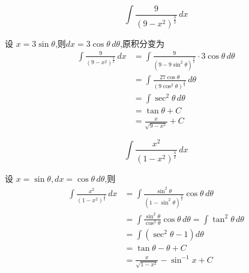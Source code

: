 \begin{questions}
    \question 
    \[
    \int \frac{9}{(9 - x^2)^{\frac{3}{2}}} \, dx
    \]
    \begin{solution}
        设 $x = 3\sin\theta$,则$dx = 3\cos\theta \, d\theta$,原积分变为
        \begin{align*}
        \int \frac{9}{(9 - x^2)^{\frac{3}{2}}} \, dx
        &= \int \frac{9}{(9 - 9\sin^2\theta)^{\frac{3}{2}}} \cdot 3\cos\theta \, d\theta\\
        &= \int \frac{27\cos\theta}{(9\cos^2\theta)^{\frac{3}{2}}} \, d\theta\\
        &= \int \sec^2\theta \, d\theta\\
        &= \tan\theta + C \\
        &= \frac{x}{\sqrt{9-x^2}} + C
        \end{align*}
    \end{solution}

    \question 
    \[
    \int \frac{x^2}{(1-x^2)^{\frac{3}{2}}} \,dx
    \]
    \begin{solution}
        设 $x = \sin \theta, dx = \cos \theta \, d\theta$,则
        \begin{align*}
        \int \frac{x^2}{(1-x^2)^{\frac{3}{2}}} \,dx
        &=\int \frac{\sin^2 \theta}{(1 - \sin^2 \theta)^{\frac{3}{2}}} \cos \theta \, d\theta \\
        &= \int \frac{\sin^2 \theta}{\cos^3 \theta} \cos \theta \, d\theta = \int \tan^2 \theta \, d\theta \\
        &= \int (\sec^2 \theta - 1) d\theta \\
        &= \tan \theta - \theta + C \\
        &= \frac{x}{\sqrt{1-x^2}} - \sin^{-1} x + C
        \end{align*}
    \end{solution}


\end{questions}

